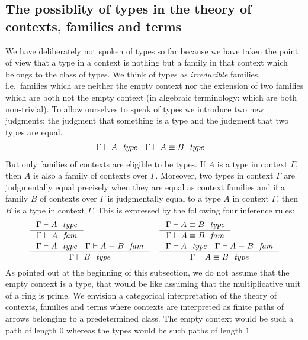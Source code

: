 \subsection{The possiblity of types in the theory of contexts, families and
terms}
We have deliberately not spoken of types so far because we have taken the point
of view that a type in a context is nothing but a family in that context which
belongs to the class of types. We think of types as \emph{irreducible} families,
i.e.\ families which are neither the empty context nor the extension of two
families which are both not the empty context (in algebraic terminology: which
are both non-trivial). To allow ourselves to speak of types we introduce two
new judgments: the judgment that something is a type and the judgment that two
types are equal.
\begin{align*}
\jtype*{\Gamma}{A} 
& \jtypeeq*{\Gamma}{A}{B}
\end{align*}
But only families of contexts are eligible to be types. If $A$ is a type
in context $\Gamma$, then $A$ is also a family of contexts over $\Gamma$. 
Moreover, two types in context $\Gamma$ are judgmentally equal precisely when they are equal
as context families and if a family $B$ of contexts over $\Gamma$ is
judgmentally equal to a type $A$ in context $\Gamma$, then $B$ is a type in
context $\Gamma$. This is expressed by the following four inference rules:
\begin{align*}
& \inference
  { \jtype{\Gamma}{A}
    }
  { \jfam{\Gamma}{A}
    }
& & \inference
    { \jtypeeq{\Gamma}{A}{B}
      }
    { \jfameq{\Gamma}{A}{B}
      }
    \\
& \inference
  { \jtype{\Gamma}{A}
    \jfameq{\Gamma}{A}{B}
    }
  { \jtype{\Gamma}{B}
    }
& & \inference
    { \jtype{\Gamma}{A}
      \jfameq{\Gamma}{A}{B}
      }
    { \jtypeeq{\Gamma}{A}{B}
      }
\end{align*}
As pointed out at the beginning of this subsection, 
we do not assume that the empty context is a type, that would be like
assuming that the multiplicative unit of a ring is prime. We envision a
categorical interpretation of the theory of contexts, families and terms where 
contexts are interpreted as finite paths of arrows belonging to a predetermined
class. The empty context would be such a path of length $0$ whereas the types
would be such paths of length $1$.

